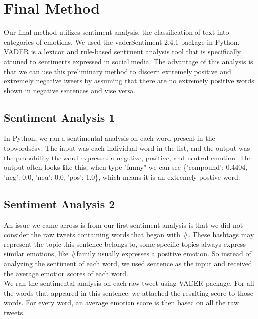 \documentclass[]{article}
\begin{document}
\section{Final Method}

Our final method utilizes sentiment analysis, the classification of text into categories of emotions. We used the vaderSentiment 2.4.1 package in Python. VADER is a lexicon and rule-based sentiment analysis tool that is specifically attuned to sentiments expressed in social media. The advantage of this analysis is that we can use this preliminary method to discern extremely positive and extremely negative tweets by assuming that there are no extremely positive words shown in negative sentences and vise versa. \\

\subsection{Sentiment Analysis 1}

In Python, we ran a sentimental analysis on each word present in the topwords\.csv. The input was each individual word in the list, and the output was the probability the word expresses a negative, positive, and neutral emotion. The output often looks like this, when type "funny" we can see \{'compound': 0.4404, 'neg': 0.0, 'neu': 0.0, 'pos': 1.0\}, which means it is an extremely postive word. \\


\subsection{Sentiment Analysis 2}

An issue we came across is from our first sentiment analysis is that we did not consider the raw tweets containing words that began with \#. These hashtags may represent the topic this sentence belongs to, some specific topics always express similar emotions, like \#family usually expresses a positive emotion. So instead of analyzing the sentiment of each word, we used sentence as the input and received the average emotion scores of each word.\\

We ran the sentimental analysis on each raw tweet using VADER package. For all the words that appeared in this sentence, we attached the resulting score to those words. For every word, an average emotion score is then based on all the raw tweets. \\ 
\end{document}
